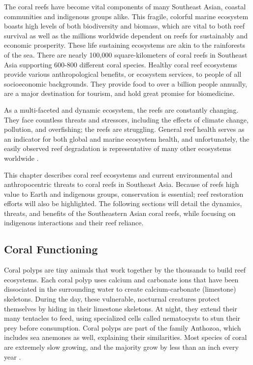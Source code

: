\documentclass{book}\usepackage{knitr}
\begin{document}
The coral reefs have become vital components of many Southeast Asian, coastal communities and indigenous groups alike. This fragile, colorful marine ecosystem boasts high levels of both biodiversity and biomass, which are vital to both reef survival as well as the millions worldwide dependent on reefs for sustainably and economic prosperity. These life sustaining ecosystems are akin to the rainforests of the sea. There are nearly 100,000 square-kilometers of coral reefs in Southeast Asia supporting 600-800 different coral species. Healthy coral reef ecosystems provide various anthropological benefits, or ecosystem services, to people of all socioeconomic backgrounds. They provide food to over a billion people annually, are a major destination for tourism, and hold great promise for biomedicine. 

As a multi-faceted and dynamic ecosystem, the reefs are constantly changing. They face countless threats and stressors, including the effects of climate change, pollution, and overfishing; the reefs are struggling. General reef health serves as an indicator for both global and marine ecosystem health, and unfortunately, the easily observed reef degradation is representative of many other ecosystems worldwide \citep{RAR}.

This chapter describes coral reef ecosystems and current environmental and anthropocentric threats to coral reefs in Southeast Asia.  Because of reefs high value to Earth and indigenous groups, conservation is essential; reef restoration efforts will also be highlighted. The following sections will detail the dynamics, threats, and benefits of the Southeastern Asian coral reefs, while focusing on indigenous interactions and their reef reliance.

\subsection{Coral Functioning}

Coral polyps are tiny animals that work together by the thousands to build reef ecosystems. Each coral polyp uses calcium and carbonate ions that have been dissociated in the surrounding water to create calcium-carbonate (limestone) skeletons. During the day, these vulnerable, nocturnal creatures protect themselves by hiding in their limestone skeletons. At night, they extend their many tentacles to feed, using specialized cells called nematocysts to stun their prey before consumption. Coral polyps are part of the family Anthozoa, which includes sea anemones as well, explaining their similarities. Most species of coral are extremely slow growing, and the majority grow by less than an inch every year \citep{coralreefalliance_2021}.
\end{document}
